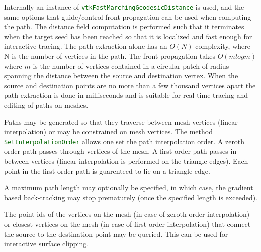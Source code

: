\documentclass{InsightArticle}
\def\code#1{\small\textcolor{darkgreen}{\texttt{#1}}}
\begin{document}
Internally an instance of \code{vtkFastMarchingGeodesicDistance} is used, and the same options that guide/control front propagation can be used when computing the path.
The distance field computation is performed such that it terminates when the target seed has been reached so that it is localized and fast enough for interactive tracing. The path extraction alone has an $O(N)$ complexity, where N is the number of vertices in the path. The front propagation takes $O(m log m)$ where $m$ is the number of vertices contained in a circular patch of radius spanning the distance between the source and destination vertex. When the source and destination points are no more than a few thousand vertices apart the path extraction is done in milliseconds and is suitable for real time tracing and editing of paths on meshes.

Paths may be generated so that they traverse between mesh vertices (linear interpolation) or may be constrained on mesh vertices. The method \code{SetInterpolationOrder} allows one set the path interpolation order. A zeroth
order path passes through vertices of the mesh. A first order path passes
in between vertices (linear interpolation is performed on the triangle edges).
Each point in the first order path is guarenteed to lie on a triangle edge.

A maximum path length may optionally be specified, in which case, the gradient based
back-tracking may stop prematurely (once the specified length is exceeded).

The point ids of the vertices on the mesh (in case of zeroth order interpolation) or closest
vertices on the mesh (in case of first order interpolation) that connect the source to the destination
point may be queried. This can be used for interactive surface clipping.
\end{document}
